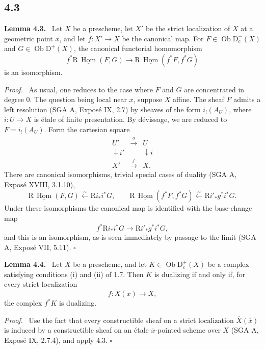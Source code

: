 \documentclass[12pt]{article}
\newcommand{\Hom}{\operatorname{Hom}}
\newcommand{\ob}{\operatorname{Ob}}
\newcommand{\D}{\mathrm D}
\newcommand{\R}{\mathrm R}
\newcommand{\ol}[1]{\overline{#1}}
\newcommand{\qedtext}{\hfill$\square$}
\newenvironment{statement}[1]{\par\medskip\noindent\textbf{#1.}\ }{\par\medskip}
\newenvironment{prooftext}[1][Proof]{\par\noindent\emph{#1.}\ }{\par\medskip}
\begin{document}
\subsection*{4.3}
\begin{statement}{Lemma 4.3}
Let $X$ be a prescheme, let $X'$ be the strict localization of $X$ at a geometric point $\ol x$, and let $f:X'\to X$ be the canonical map. For $F\in\ob\D_c^-(X)$ and $G\in\ob\D^+(X)$, the canonical functorial homomorphism
\[
   f^*\R\,\underline{\Hom}(F,G)
      \longrightarrow
   \R\,\underline{\Hom}(f^*F,f^*G)
\]
is an isomorphism.
\end{statement}

\begin{prooftext}
As usual, one reduces to the case where $F$ and $G$ are concentrated in degree $0$. The question being local near $x$, suppose $X$ affine. The sheaf $F$ admits a left resolution (SGA A, Exposé IX, 2.7) by sheaves of the form $i_!(A_U)$, where $i:U\to X$ is étale of finite presentation. By dévissage, we are reduced to $F=i_!(A_U)$. Form the cartesian square
\[
\begin{array}{ccc}
 U'&\xrightarrow{g}&U\\
 \downarrow i'&&\downarrow i\\
 X'&\xrightarrow{f}&X.
\end{array}
\]
There are canonical isomorphisms, trivial special cases of duality (SGA A, Exposé XVIII, 3.1.10),
\[
   \R\,\underline{\Hom}(F,G)\xleftarrow{\sim}\R i_*i^*G,
   \qquad
   \R\,\underline{\Hom}(f^*F,f^*G)\xleftarrow{\sim}\R i'_*g^*i^*G.
\]
Under these isomorphisms the canonical map is identified with the base-change map
\[
   f^*\R i_*i^*G\longrightarrow \R i'_*g^*i^*G,
\]
and this is an isomorphism, as is seen immediately by passage to the limit (SGA A, Exposé VII, 5.11). \qedtext
\end{prooftext}

\begin{statement}{Lemma 4.4}
Let $X$ be a prescheme, and let $K\in\ob\D_c^+(X)$ be a complex satisfying conditions (i) and (ii) of 1.7. Then $K$ is dualizing if and only if, for every strict localization
\[
   f:\ol X(\ol x)\longrightarrow X,
\]
the complex $f^*K$ is dualizing.
\end{statement}

\begin{prooftext}
Use the fact that every constructible sheaf on a strict localization $\ol X(\ol x)$ is induced by a constructible sheaf on an étale $\ol x$-pointed scheme over $X$ (SGA A, Exposé IX, 2.7.4), and apply 4.3. \qedtext
\end{prooftext}
\end{document}
